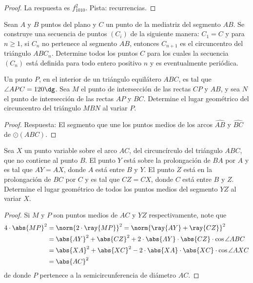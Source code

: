 \begin{proof}
	La respuesta es $f_{1010}^2$. Pista: recurrencias.
\end{proof}

\begin{probEG}[IberoAmerican 1999/6]
	Sean $A$ y $B$ puntos del plano y $C$ un punto de la mediatriz del segmento $AB$. Se construye una secuencia de puntos $(C_i)$ de la siguiente manera: $C_1=C$ y para $n\ge 1$, si $C_n$ no pertenece al segmento $AB$, entonces $C_{n+1}$ es el circuncentro del triángulo $ABC_n$. Determine todos los puntos $C$ para los cuales la secuencia $(C_n)$ está definida para todo entero positivo $n$ y es eventualmente periódica.
\end{probEG}

\begin{probEG}[IberoAmerican 2002/3]
	Un punto $P$, en el interior de un triángulo equilátero $ABC$, es tal que $\angle APC=120\dg$. Sea $M$ el punto de intersección de las rectas $CP$ y $AB$, y sea $N$ el punto de intersección de las rectas $AP$ y $BC$. Determine el lugar geométrico del circuncentro del triángulo $MBN$ al variar $P$.
\end{probEG}

\begin{proof}
	Respuesta: El segmento que une los puntos medios de los arcos $\widehat{AB}$ y $\widehat{BC}$ de $\odot(ABC)$.
\end{proof}

\begin{probMB}
	Sea $X$ un punto variable sobre el arco $AC$, del circuncírculo del triángulo $ABC$, que no contiene al punto $B$. El punto $Y$ está sobre la prolongación de $BA$ por $A$ y es tal que $AY=AX$, donde $A$ está entre $B$ y $Y$. El punto $Z$ está en la prolongación de $BC$ por $C$ y es tal que $CZ=CX$, donde $C$ está entre $B$ y $Z$. Determine el lugar geométrico de todos los puntos medios del segmento $YZ$ al variar $X$.
\end{probMB}

\begin{proof}
	Si $M$ y $P$ son puntos medios de $AC$ y $YZ$ respectivamente, note que
	\begin{align*}
		4\cdot\abs{MP}^2
		&=\norm{2\cdot\ray{MP}}^2=\norm{\ray{AY}+\ray{CZ}}^2\\
		&=\abs{AY}^2+\abs{CZ}^2+2\cdot\abs{AY}\cdot\abs{CZ}\cdot\cos{\angle ABC}\\
		&=\abs{XA}^2+\abs{XC}^2-2\cdot\abs{XA}\cdot\abs{XC}\cdot\cos{\angle AXC}\\
		&=\abs{AC}^2
	\end{align*}
	de donde $P$ pertenece a la semicircunferencia de diámetro $AC$.
\end{proof}

